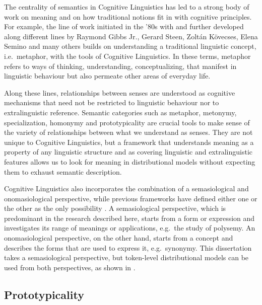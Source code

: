 \documentclass[
]{book}
\begin{document}
The centrality of semantics in Cognitive Linguistics has led to a strong body of work on meaning and on how traditional notions fit in with cognitive principles.
For example, the line of work initiated in the '80s with \textcite{lakoff.johnson_2003} and further developed along different lines by Raymond Gibbs Jr., Gerard Steen, Zoltán Kövecses, Elena Semino and many others \autocites[see for example][]{gibbs.steen_1999,gibbs_2008,semino_2008,kovecses_2015} builds on understanding a traditional linguistic concept, i.e.~metaphor, with the tools of Cognitive Linguistics. In these terms, metaphor refers to ways of thinking, understanding, conceptualizing, that manifest in linguistic behaviour but also permeate other areas of everyday life.

Along these lines, relationships between senses are understood as cognitive mechanisms that need not be restricted to linguistic behaviour nor to extralinguistic reference. Semantic categories such as metaphor, metonymy, specialization, homonymy and prototypicality are crucial tools to make sense of the variety of relationships between what we understand as senses. They are not unique to Cognitive Linguistics, but a framework that understands meaning as a property of any linguistic structure and as covering linguistic and extralinguistic features allows us to look for meaning in distributional models without expecting them to exhaust semantic description.

Cognitive Linguistics also incorporates the combination of a semasiological and onomasiological perspective, while previous frameworks have defined either one or the other as the only possibility \autocite{geeraerts_2010a}. A semasiological perspective, which is predominant in the research described here, starts from a form or expression and investigates its range of meanings or applications, e.g.~the study of polysemy. An onomasiological perspective, on the other hand, starts from a concept and describes the forms that are used to express it, e.g.~synonymy. This dissertation takes a semasiological perspective, but token-level distributional models can be used from both perspectives, as shown in \textcite{depascale_2019}.

\hypertarget{prototypicality}{%
\subsection{Prototypicality}\label{prototypicality}}
\end{document}
